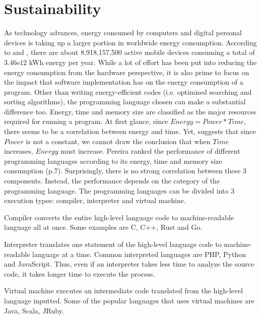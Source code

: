 \section{Sustainability}
\label{Sustainability}
As technology advances, energy consumed by computers and digital personal devices is taking up a larger portion in worldwide energy consumption. 
According to \cite{energy} and \cite{energypy}, there are about 8,918,157,500 active mobile devices consuming a total of $3.46\mathrm{e}{12}$ kWh energy per year.
While a lot of effort has been put into reducing the energy consumption from the hardware perspective,
it is also prime to focus on the impact that software implementation has on the energy consumption of a program.
Other than writing energy-efficient codes (i.e. optimised searching and sorting algorithms), the programming language 
chosen can make a substantial difference too. Energy, time and memory size are classified as the major resources required for running a program.
At first glance, since \(Energy = Power * Time\), there seems to be a correlation between energy and time. Yet,
\cite{energyplanguage} suggests that since \(Power\) is not a constant, we cannot draw the conclusion that
when \(Time\) increases, \(Energy\) must increase. 
Pereira ranked the performance of different programming languages according to its energy, time and memory size consumption (p.7). 
Surprisingly, there is no strong correlation between these 3 components. 
Instead, the performance depends on the category of the programming language.
The programming languages can be divided into 3 execution types: compiler, interpreter and virtual machine.

\begin{description}
    \item Compiler converts the entire high-level language code to machine-readable language all at once. Some examples are C, C++, Rust and Go. 
    \item Interpreter translates one statement of the high-level language code to machine-readable language at a time. Common interpreted languages are PHP, Python and JavaScript.
    Thus, even if an interpreter takes less time to analyze the source code, it takes longer time to execute the process.
    \item Virtual machine executes an intermediate code translated from the high-level language inputted. Some of the popular languages that uses virtual machines are Java, Scala, JRuby.
\end{description}

